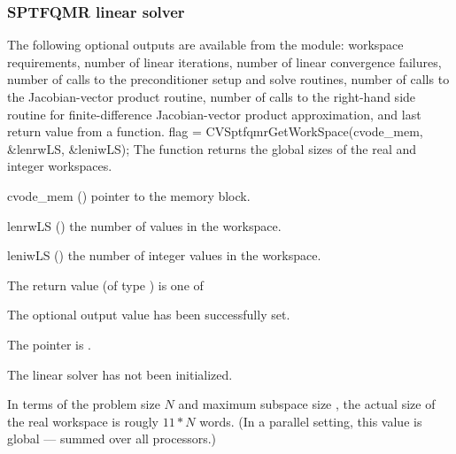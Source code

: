 
\subsubsection{SPTFQMR linear solver}\label{sss:optout_sptfqmr}
The following optional outputs are available from the {\cvsptfqmr}
module: workspace requirements, number of linear iterations, number of
linear convergence failures, number of calls to the preconditioner
setup and solve routines, number of calls to the Jacobian-vector
product routine, number of calls to the right-hand side routine for
finite-difference Jacobian-vector product approximation, and last
return value from a {\cvsptfqmr} function.
{
  flag = CVSptfqmrGetWorkSpace(cvode\_mem, \&lenrwLS, \&leniwLS);
}
{
  The function  returns the global sizes of the
  {\cvsptfqmr} real and integer workspaces.
}
{
  \begin{args}
  \item[cvode\_mem] ()
    pointer to the {\cvode} memory block.
  \item[lenrwLS] ()
    the number of  values in the {\cvsptfqmr} workspace.
  \item[leniwLS] ()
    the number of integer values in the {\cvsptfqmr} workspace.
  \end{args}
}
{
  The return value  (of type ) is one of
  \begin{args}
  \item[\Id{CVSPTFQMR\_SUCCESS}] 
    The optional output value has been successfully set.
  \item[\Id{CVSPTFQMR\_MEM\_NULL}]
    The  pointer is .
  \item[\Id{CVSPTFQMR\_LMEM\_NULL}]
    The {\cvsptfqmr} linear solver has not been initialized.
  \end{args}
}
{
  In terms of the problem size $N$ and maximum subspace size , 
  the actual size of the real workspace is rougly  $11*N$  words.
  (In a parallel setting, this value is global --- summed over all processors.)
}
